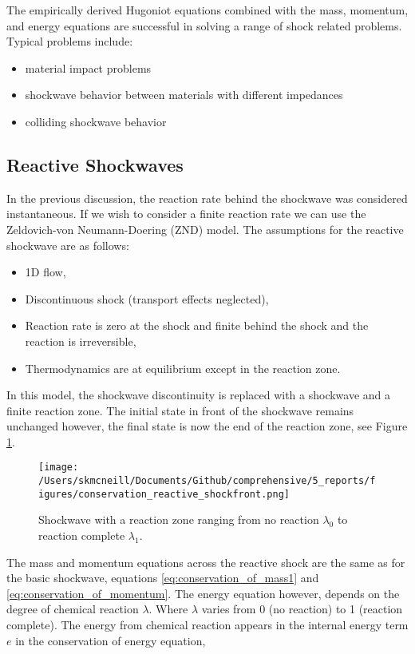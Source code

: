 	
The empirically derived Hugoniot equations combined with the mass, momentum, and energy equations are successful in solving a range of shock related problems.  Typical problems include:
\begin{itemize}
\item material impact problems
\item shockwave behavior between materials with different impedances
\item colliding shockwave behavior
\end{itemize}

\subsection{Reactive Shockwaves}
In the previous discussion, the reaction rate behind the shockwave was considered instantaneous.  If we wish to consider a finite reaction rate we can use the Zeldovich-von Neumann-Doering (ZND) model\cite{Zeldovich1940}\cite{VonN1942}.  The assumptions for the reactive shockwave are as follows:
\begin{itemize}
\item 1D flow,
\item Discontinuous shock (transport effects neglected),
\item Reaction rate is zero at the shock and finite behind the shock and the reaction is irreversible,
\item Thermodynamics are at equilibrium except in the reaction zone.
\end{itemize}
In this model, the shockwave discontinuity is replaced with a shockwave and a finite reaction zone.  The initial state in front of the shockwave remains unchanged however, the final state is now the end of the reaction zone, see Figure \ref{fig:p_t_reaction_zone}. 
 \begin{figure}
  \begin{center}
   \texttt{[image: /Users/skmcneill/Documents/Github/comprehensive/5\_reports/figures/conservation\_reactive\_shockfront.png]}
  \end{center}
  \caption{Shockwave with a reaction zone ranging from no reaction $\lambda_0$ to reaction complete $\lambda_1$.}
\label{fig:p_t_reaction_zone}
\end{figure}%
The mass and momentum equations across the reactive shock are the same as for the basic shockwave, equations  \ref{eq:conservation_of_mass1} and \ref{eq:conservation_of_momentum}.  The energy equation however, depends on the degree of chemical reaction $\lambda$.  Where $\lambda$ varies from 0 (no reaction) to 1 (reaction complete).  The energy from chemical reaction appears in the internal energy term $e$ in the conservation of energy equation,
